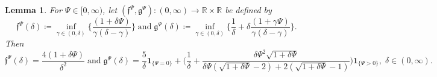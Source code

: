 \documentclass[10pt]{article} %
\newtheorem{lemma}[theorem]{Lemma}
\newcommand\ff{\mathfrak f}
\newcommand\fg{\mathfrak g}
\def \R{\mathbb{R}}
\begin{document}
\begin{lemma}\label{lem::analysis_ff_fg}
	For $\Psi \in [0,\infty)$, let $(\ff^\Psi,\fg^\Psi) : (0,\infty) \rightarrow \R \times \R$ be defined by
	\begin{equation*}
		\ff^\Psi(\delta) \coloneqq \inf_{\gamma\in (0,\delta)} \bigg\{\frac{(1+\delta\Psi)}{\gamma(\delta-\gamma)}\bigg\} \; \text{and} \; \fg^\Psi(\delta) \coloneqq \inf_{\gamma \in (0,\delta)} \bigg\{\frac{1}{\delta} + \delta \frac{(1+\gamma\Psi)}{\gamma(\delta-\gamma)}\bigg\}.
	\end{equation*}
	Then
	\begin{equation*}
		\ff^\Psi(\delta) = \frac{4(1+\delta\Psi)}{\delta^2} \; \text{and} \; \fg^\Psi(\delta) = \frac{5}{\delta} \mathbf{1}_{\{\Psi = 0\}} + \bigg(  \frac{1}{\delta} + \frac{\delta\Psi^2\sqrt{1+\delta\Psi}}{\delta\Psi(\sqrt{1+\delta\Psi}-2)+2(\sqrt{1+\delta\Psi}-1)}\bigg)\mathbf{1}_{\{\Psi > 0\}}, \; \delta \in (0,\infty).
	\end{equation*}
\end{lemma}
\end{document}
